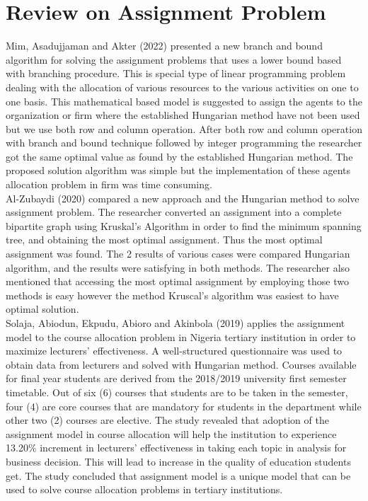 \documentclass[11pt]{report}
\newcommand{\NI}{\noindent}
\begin{document}
	\section{Review on Assignment Problem}
	Mim, Asadujjaman and Akter (2022) presented a new branch and bound algorithm for solving the assignment problems that uses a lower bound based with branching procedure. This is special type of linear programming problem dealing with the allocation of various resources to the various activities on one to one basis. This mathematical based model is suggested to assign the agents to the organization or firm where the established Hungarian method have not been used but we use both row and column operation. After both row and column operation with branch and bound technique followed by integer programming the researcher got the same optimal value as found by the established Hungarian method. The proposed solution algorithm was simple but the implementation of these agents allocation problem in firm was time consuming.\\
	
	\NI Al-Zubaydi (2020) compared a new approach and the Hungarian method to solve assignment problem. The researcher converted an assignment into a complete bipartite graph using Kruskal's Algorithm in order to find the minimum spanning tree, and obtaining the most optimal assignment. Thus the most optimal assignment was found. The 2 results of various cases were compared Hungarian algorithm, and the results were satisfying in both methods. The researcher also mentioned that accessing the most optimal assignment by employing those two methods is easy however the method Kruscal's algorithm was easiest to have optimal solution.\\
	
	\NI Solaja, Abiodun, Ekpudu, Abioro and Akinbola (2019) applies the assignment model to the course allocation problem in Nigeria tertiary institution in order to maximize lecturers’ effectiveness. A well-structured questionnaire was used to obtain data from lecturers and solved with Hungarian
	method. Courses available for final year students are derived from the 2018/2019 university first semester timetable. Out of six (6) courses that students are to be taken in the semester, four (4) are core courses that are mandatory for students in the department while other two (2) courses are elective. The study revealed that adoption of the assignment model in course allocation will help the institution to experience 13.20\% increment in lecturers’ effectiveness in taking each topic in analysis for business decision. This will lead to increase in the quality of education students get. The study concluded that assignment model is a unique model that can be used to solve course allocation problems in tertiary institutions.\\
	
\end{document}
